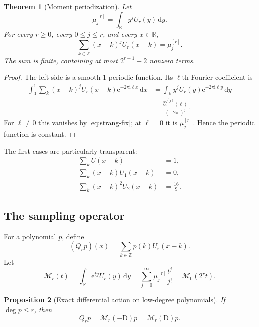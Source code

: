 \documentclass[11pt,oneside]{article}
\newtheorem{theorem}{Theorem}[section]
\newtheorem{proposition}[theorem]{Proposition}
\theoremstyle{definition}
\theoremstyle{remark}
\newcommand{\R}{\mathbb R}
\newcommand{\Z}{\mathbb Z}
\newcommand{\e}{\mathrm e}
\newcommand{\ii}{\mathrm i}
\newcommand{\dd}{\,\mathrm d}
\newcommand{\D}{\mathrm D}
\newcommand{\M}{\mathcal M}
\begin{document}
\begin{theorem}[Moment periodization]
\label{thm:moment-periodization}
Let
\begin{equation}
 \mu_j^{[r]}=\int_{\R}y^jU_r(y)\dd y.
 \label{eq:scaled-moments}
\end{equation}
For every $r\ge0$, every $0\le j\le r$, and every $x\in\R$,
\begin{equation}
 \sum_{k\in\Z}(x-k)^jU_r(x-k)=\mu_j^{[r]}.
 \label{eq:moment-periodization}
\end{equation}
The sum is finite, containing at most $2^{r+1}+2$ nonzero terms.
\end{theorem}

\begin{proof}
The left side is a smooth $1$-periodic function.  Its $\ell$th Fourier coefficient is
\begin{align*}
 \int_0^1\sum_k(x-k)^jU_r(x-k)\e^{-2\pi\ii\ell x}\dd x
 &=\int_{\R}y^jU_r(y)\e^{-2\pi\ii\ell y}\dd y\\
 &=\frac{\widehat U_r^{(j)}(\ell)}{(-2\pi\ii)^j}.
\end{align*}
For $\ell\ne0$ this vanishes by \eqref{eq:strang-fix}; at $\ell=0$ it is $\mu_j^{[r]}$.  Hence the periodic function is constant.
\end{proof}

The first cases are particularly transparent:
\begin{align}
 \sum_kU(x-k)&=1,
 \label{eq:partition-unity}\\
 \sum_k(x-k)U_1(x-k)&=0,
 \label{eq:first-moment-periodization}\\
 \sum_k(x-k)^2U_2(x-k)&=\frac{16}{9}.
 \label{eq:second-moment-periodization}
\end{align}

\subsection{The sampling operator}
For a polynomial $p$, define
\begin{equation}
 (Q_rp)(x)=\sum_{k\in\Z}p(k)U_r(x-k).
 \label{eq:sampling-operator}
\end{equation}
Let
\begin{equation}
 \M_r(t)=\int_{\R}\e^{ty}U_r(y)\dd y
 =\sum_{j=0}^{\infty}\mu_j^{[r]}\frac{t^j}{j!}
 =\M_0(2^rt).
 \label{eq:Mr}
\end{equation}

\begin{proposition}[Exact differential action on low-degree polynomials]
\label{prop:Qr-action}
If $\deg p\le r$, then
\begin{equation}
 Q_rp=\M_r(-\D)p=\M_r(\D)p.
 \label{eq:Qr-action}
\end{equation}
\end{proposition}
\end{document}
